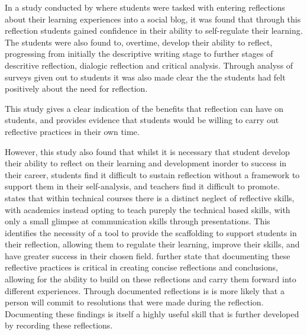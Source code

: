 \documentclass{l4proj}
\begin{document}
In a study conducted by \citet{mcdermott_developing_nodate} where students were tasked with entering reflections about their learning experiences into a 
social blog, it was found that through this reflection students gained confidence in their ability to self-regulate their learning. The students were also
found to, overtime, develop their ability to reflect, progressing from initially the descriptive writing stage to further stages of descritive reflection,
dialogic reflection and critical analysis. Through analyss of surveys given out to students it was also made clear the the students had felt 
positively about the need for reflection.

This study gives a clear indication of the benefits that reflection can have on students, and provides evidence that students would be willing to 
carry out reflective practices in their own time.

However, this study also found that whilst it is necessary that student develop their ability to reflect on their learning and development inorder
to success in their career, students find it difficult to sustain reflection without a framework to support them in their self-analysis, and teachers
find it difficult to promote. \citet{thurner_development_2020} states that within technical courses there is a distinct neglect of reflective skills,
with academics instead opting to teach pureply the technical based skills, with only a small glimpse at communication skills through presentations.
This identifies the necessity of a tool to provide the scaffolding to support students in their reflection, allowing
them to regulate their learning, improve their skills, and have greater success in their chosen field. \citet{thurner_development_2020} further state
that documenting these reflective practices is critical in creating concise reflections and conclusions, allowing for the ability to build on these 
reflections and carry them forward into different experiences. Through documented reflections is is more likely that a person will commit to resolutions
that were made during the reflection. Documenting these findings is itself a highly useful skill that is further developed by recording these reflections.
\end{document}
